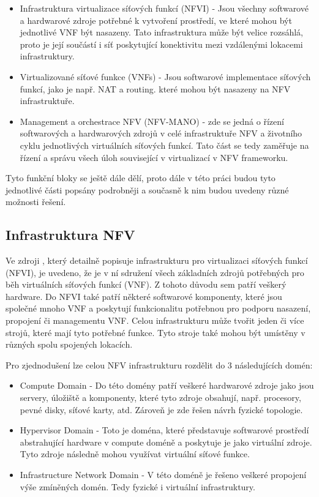 \begin{itemize}
\item Infrastruktura virtualizace síťových funkcí (NFVI) - Jsou všechny softwarové a hardwarové zdroje potřebné k vytvoření prostředí, ve které mohou být jednotlivé VNF být nasazeny. Tato infrastruktura může být velice rozsáhlá, proto je její součástí i síť poskytující konektivitu mezi vzdálenými lokacemi infrastruktury.\cite{NFV_terminology}
\item Virtualizované síťové funkce (VNFs) - Jsou softwarové implementace síťových funkcí, jako je např. NAT a routing. které mohou být nasazeny na NFV infrastruktuře.
\item Management a orchestrace NFV (NFV-MANO) - zde se jedná o řízení softwarových a hardwarových zdrojů v celé infrastruktuře NFV a životního cyklu jednotlivých virtuálních síťových funkcí. Tato část se tedy zaměřuje na řízení a správu všech úloh související v virtualizací v NFV frameworku. \cite{NFV_terminology}
\end{itemize}

Tyto funkční bloky se ještě dále dělí, proto dále v této práci budou tyto jednotlivé části popsány podrobněji a současně k nim budou uvedeny různé možnosti řešení.

\subsection{Infrastruktura NFV}

Ve zdroji \cite{NFV_infrastructure}, který detailně popisuje infrastrukturu pro virtualizaci síťových funkcí (NFVI), je uvedeno, že je v ní sdružení všech základních zdrojů potřebných pro běh virtuálních síťových funkcí (VNF). Z tohoto důvodu sem patří veškerý hardware. Do NFVI také patří některé softwarové komponenty, které jsou společné mnoho VNF a poskytují funkcionalitu potřebnou pro podporu nasazení, propojení či managementu VNF. Celou infrastrukturu může tvořit jeden či více strojů, které mají tyto potřebné funkce. Tyto stroje také mohou být umístěny v různých spolu spojených lokacích. 

Pro zjednodušení lze celou NFV infrastrukturu rozdělit do 3 následujících domén:

\begin{itemize}
\item Compute Domain - Do této domény patří veškeré hardwarové zdroje jako jsou servery, úložiště a komponenty, které tyto zdroje obsahují, např. procesory, pevné disky, síťové karty, atd. Zároveň je zde řešen návrh fyzické topologie. \cite{NFV_compute}
\item Hypervisor Domain - Toto je doména, které představuje softwarové prostředí abstrahující hardware v compute doméně a poskytuje je jako virtuální zdroje. Tyto zdroje následně mohou využívat virtuální síťové funkce. \cite{NFV_hypervisor}
\item Infrastructure Network Domain - V této doméně je řešeno veškeré propojení výše zmíněných domén. Tedy fyzické i virtuální infrastruktury.\cite{NFV_network}
\end{itemize}

